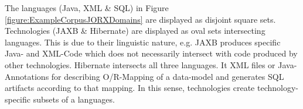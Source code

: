 The languages (\Gls{Java}, \acrshort{XML} \& \acrshort{SQL}) in Figure \ref{figure:ExampleCorpusJORXDomains} are displayed as disjoint square sets.
Technologies (\acrshort{JAXB} \& \Gls{Hibernate}) are displayed as oval sets intersecting languages.
This is due to their linguistic nature, e.g. \acrshort{JAXB} produces specific \Gls{Java}- and \acrshort{XML}-Code which does not necessarily intersect with code produced by other technologies.
\Gls{Hibernate} intersects all three languages.
It \acrshort{XML} files or \Gls{Java}-Annotations for describing \acrshort{O/R-Mapping} of a data-model and generates \acrshort{SQL} artifacts according to that mapping.
In this sense, technologies create technology-specific subsets of a languages.


%
